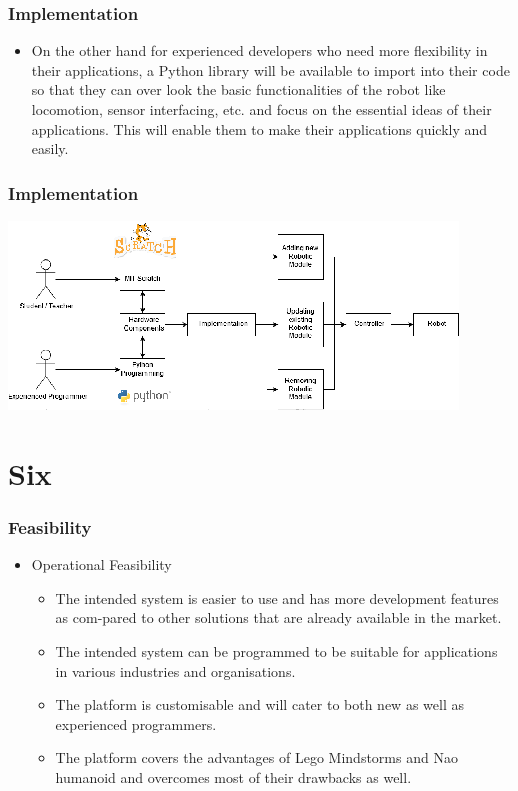 \documentclass{beamer}
\begin{document}
\begin{frame}
\frametitle{Implementation}
\begin{center}
\justifying

\begin{itemize}
\item On the other hand for experienced developers who need more flexibility in their applications,
a Python library will be available to import into their code so that they can over look the basic
functionalities of the robot like locomotion, sensor interfacing, etc. and focus on the essential
ideas of their applications. This will enable them to make their applications quickly and
easily.

\end{itemize}
\end{center}
\end{frame} 

\begin{frame}
\frametitle{Implementation}
\begin{center}
\justifying
\includegraphics[height=.5\textheight]{Images/two.png}
\end{center}
\end{frame} 

\section{Six}
\begin{frame}
\frametitle{Feasibility}
\begin{center}
\justifying
\begin{itemize}
\item Operational Feasibility
	\begin{itemize}
	\item The intended system is easier to use and has more development features as com-pared to other solutions that are already available in the market.	
	\item The intended system can be programmed to be suitable for applications in various industries and organisations.
	\item The platform is customisable and will cater to both new as well as experienced
programmers.
	\item The platform covers the advantages of Lego Mindstorms and Nao humanoid and overcomes most of their drawbacks as well.
	\end{itemize}
\end{itemize}
\end{center}
\end{frame} 
\end{document}
